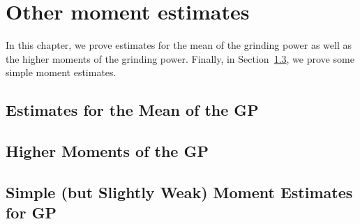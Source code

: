 \chapter{Other moment estimates}\label{sec:praos-other-moments}

In this chapter, 
we prove estimates for the mean of the grinding power 
as well as the higher moments of the grinding power. 
Finally, in Section~\ref{sec:praos-simple-moments}, 
we prove some simple moment estimates.

\section{Estimates for the Mean of the GP}\label{sec:praos-mean}



\section{Higher Moments of the GP}\label{sec:praos-higher-moments}



\section{Simple (but Slightly Weak) Moment Estimates for GP}\label{sec:praos-simple-moments}



